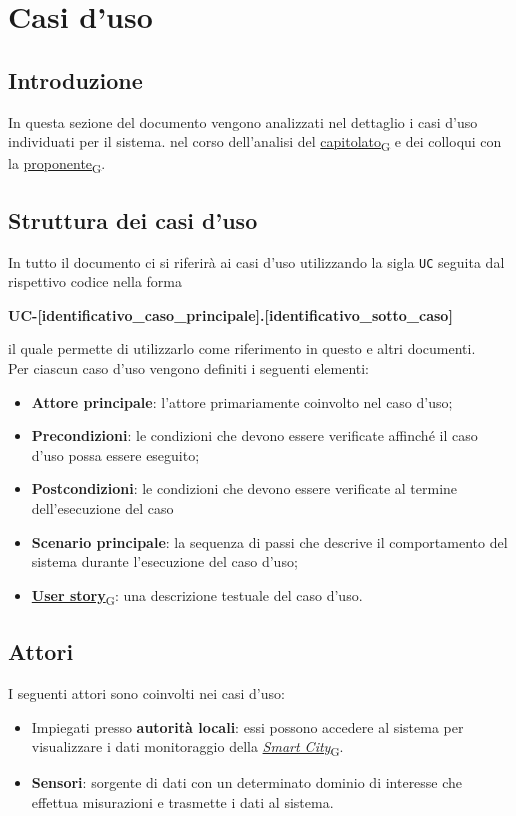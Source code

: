 \section{Casi d'uso}
\subsection{Introduzione}
In questa sezione del documento vengono analizzati nel dettaglio i casi d'uso individuati per il sistema.
nel corso dell'analisi del \href{https://7last.github.io/docs/rtb/documentazione-interna/glossario\#capitolato}{capitolato\textsubscript{G}} e dei colloqui con la \href{https://7last.github.io/docs/rtb/documentazione-interna/glossario\#proponente}{proponente\textsubscript{G}}.

\subsection{Struttura dei casi d'uso}
In tutto il documento ci si riferirà ai casi d'uso utilizzando la sigla \texttt{UC} seguita dal rispettivo codice nella forma
\begin{center}
	\textbf{UC-[identificativo\_caso\_principale].[identificativo\_sotto\_caso]}
\end{center}

il quale permette di utilizzarlo come riferimento in questo e altri documenti.\\
Per ciascun caso d'uso vengono definiti i seguenti elementi:
\begin{itemize}
	\item \textbf{Attore principale}: l'attore primariamente coinvolto nel caso d'uso;
	\item \textbf{Precondizioni}: le condizioni che devono essere verificate affinché il caso d'uso possa essere
	      eseguito;
	\item \textbf{Postcondizioni}: le condizioni che devono essere verificate al termine dell'esecuzione del caso
	\item \textbf{Scenario principale}: la sequenza di passi che descrive il comportamento del sistema durante
	      l'esecuzione del caso d'uso;
	\item \href{https://7last.github.io/docs/rtb/documentazione-interna/glossario\#user-story}{\textbf{User story}\textsubscript{G}}: una descrizione testuale del caso d'uso.
\end{itemize}


\subsection{Attori}
I seguenti attori sono coinvolti nei casi d'uso:
\begin{itemize}
	\item Impiegati presso \textbf{autorità locali}: essi possono accedere al sistema per visualizzare i dati
	      monitoraggio della \href{https://7last.github.io/docs/rtb/documentazione-interna/glossario\#smart-city}{\textit{Smart City}\textsubscript{G}}.
	\item \textbf{Sensori}: sorgente di dati con un determinato dominio di interesse che effettua misurazioni
	      e trasmette i dati al sistema.
\end{itemize}

